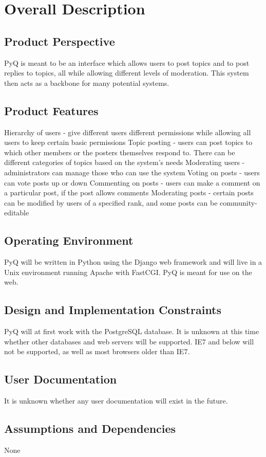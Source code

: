 \documentclass{report}
\begin{document}
  \section{Overall Description}
   \subsection{Product Perspective}
   PyQ is meant to be an interface which allows users to post topics and to post replies to topics, all while allowing different levels of moderation. This system then acts as a backbone for many potential systems.
   \subsection{Product Features}
   Hierarchy of users - give different users different permissions while allowing all users to keep certain basic permissions
   Topic posting - users can post topics to which other members or the posters themselves respond to. There can be different categories of topics based on the system's needs
   Moderating users - administrators can manage those who can use the system
   Voting on posts - users can vote posts up or down
   Commenting on posts - users can make a comment on a particular post, if the post allows comments
   Moderating posts - certain posts can be modified by users of a specified rank, and some posts can be community-editable
  \subsection{Operating Environment}
  PyQ will be written in Python using the Django web framework and will live in a Unix environment running Apache with FastCGI. PyQ is meant for use on the web.
   \subsection{Design and Implementation Constraints}
   PyQ will at first work with the PostgreSQL database. It is unknown at this time whether other databases and web servers will be supported. IE7 and below will not be supported, as well as most browsers older than IE7.
   \subsection{User Documentation}
   It is unknown whether any user documentation will exist in the future.
   \subsection{Assumptions and Dependencies}
   None
\end{document}
